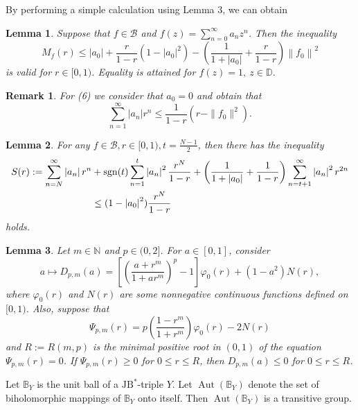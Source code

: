\documentclass{birkjour}
\theoremstyle{plain}
\newtheorem{rem}{Remark}
\newtheorem{lem}{Lemma}
\theoremstyle{definition}
\theoremstyle{definition}
\begin{document}
By performing a simple calculation using Lemma 3, we can obtain
\begin{lem}\cite{ref35}
	Suppose that $f \in \mathcal{B}$ and $f(z) = \sum_{n=0}^{\infty} a_n z^n$. Then the inequality
	\begin{equation}
		M_f(r) \le \left | a_0 \right |+\frac{r}{1-r}(1- \left | a_0 \right |^2)-(\frac{1}{1+\left | a_0\right |}+\frac{r}{1-r})\left \| f_0 \right \|^2
	\end{equation}
	is valid for $r \in [0,1)$. Equality is attained for $f(z)=1,\ z\in\mathbb{D}$.
\end{lem}
\begin{rem}
	For (6) we consider that $a_0=0$ and obtain that
	\begin{equation*}
		\sum_{n=1}^{\infty}\left | a_n\right |r^n \le \frac{1}{1-r}(r-\|f_0\|^2).
	\end{equation*}
\end{rem}
\begin{lem}\cite{ref32}
	For any $f\in \mathcal{B} , r\in [0,1), t=\frac{N-1}{2}$, then there has the inequality
	\begin{align}
		S(r):=\sum_{n=N}^{\infty} \left | a_n \right | r^n
		&+\operatorname{sgn}(t)\sum_{n=1}^{t} \left | a_n \right |^2\frac{r^N}{1-r} +\left(\frac{1}{1+\left | a_0 \right | }+\frac{1}{1-r}\right)\sum_{n=t+1}^{\infty}\left |a_n  \right |^2r^{2n} \notag\\
		&\le (1-\left |a_0  \right |^2 )\frac{r^N}{1-r}
	\end{align}
holds.
\end{lem}
\begin{lem}\cite{ref10}
	Let $m\in \mathbb{N}$ and $p\in(0,2]$. For $a\in[0,1]$, consider
	\begin{equation*}
	a\mapsto D_{p,m}(a)=\left[\left(\frac{a+r^{m}}{1+ar^{m}}\right)^{p}-1\right]\varphi_{0}(r)+(1-a^{2})N(r),
\end{equation*}
	where $\varphi_{0}(r)$ and $N(r)$ are some nonnegative continuous functions defined on $[0,1)$. Also, suppose that
	\begin{equation*}
	\Psi_{p,m}(r)=p\left(\frac{1-r^{m}}{1+r^{m}}\right)\varphi_{0}(r)-2N(r)
\end{equation*}
	and $R:=R(m,p)$ is the minimal positive root in $(0,1)$ of the equation $\Psi_{p,m}(r)=0$. If $\Psi_{p,m}(r)\ge 0$ for $0\le r\le R$, then $D_{p,m}(a)\le 0$ for $0\le r\le R$.
\end{lem}
Let $\mathbb{B}_Y$ is the unit ball of a $\mathrm{JB}^*$-triple $Y$. Let $\operatorname{Aut}(\mathbb{B}_Y)$ denote the set of biholomorphic mappings of $\mathbb{B}_Y$ onto itself. Then $\operatorname{Aut}(\mathbb{B}_Y)$ is a transitive group.
\end{document}
